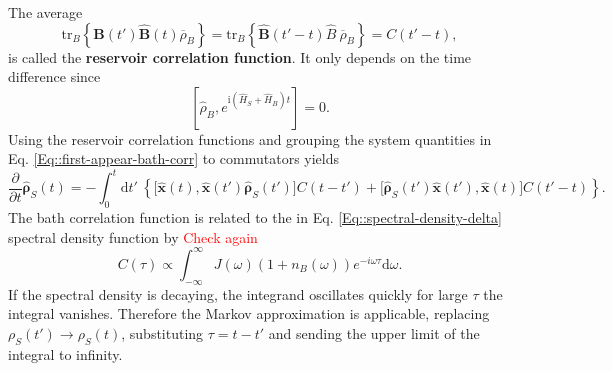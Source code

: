 	The average
	\begin{equation}
		\text{tr}_B \left\{ \hat{\boldsymbol{B}}(t') \boldsymbol{\hat{B}}(t)\overline{\rho}_B \right\} = \text{tr}_B \left\{ \hat{\boldsymbol{B}}(t' - t) {\hat{B}} ~ \overline{\rho}_B \right\} =	C(t' - t),
	\end{equation}
	is called the \textbf{reservoir correlation function}. It only depends on the time difference since
	\begin{equation}
		\left[\hat{\rho}_B,	e^{\mathrm{i} \left(\hat{H}_S + \hat{H}_B\right)t} \right] =	0.
	\end{equation}
	Using the reservoir correlation functions and grouping the system quantities in Eq. \eqref{Eq::first-appear-bath-corr} to commutators yields
	\begin{equation}
		\frac{\partial}{\partial t} \boldsymbol{\hat{\rho}}_S(t) =	- \int_{0}^{t} \text{d}t'~  \left\{\Big[\hat{\boldsymbol{x}}(t), \hat{\boldsymbol{x}}(t')\hat{\boldsymbol{\rho}}_S(t') \Big] C(t - t') + \Big[\hat{\boldsymbol{\rho}}_S(t') \hat{\boldsymbol{x}}(t'), \hat{\boldsymbol{x}}(t) \Big] C(t' - t) \right\}.
	\end{equation}
	The bath correlation function is related to the in Eq. \eqref{Eq::spectral-density-delta} spectral density function by \textcolor{red}{Check again}
	\begin{equation}
		C(\tau) \propto \int_{-\infty}^{\infty} J(\omega) ( 1 + n_B(\omega)) e^{-i\omega \tau} \text{d} \omega.
	\end{equation}
	If the spectral density is decaying, the integrand oscillates quickly for large $\tau$  the integral vanishes. Therefore the Markov approximation is applicable, replacing $\rho_S(t') \rightarrow \rho_S(t)$, substituting $\tau =	t - t'$ and sending the upper limit of the integral to infinity.

